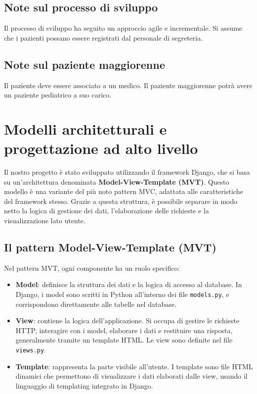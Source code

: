 \documentclass[a4paper,12pt]{article}
\begin{document}
\subsection{Note sul processo di sviluppo}
Il processo di sviluppo ha seguito un approccio agile e incrementale. 
Si assume che i pazienti possano essere registrati dal personale di segreteria.

\subsection{Note sul paziente maggiorenne}
Il paziente deve essere associato a un medico.
Il paziente maggiorenne potrà avere un paziente pediatrico a suo carico.

\section{Modelli architetturali e progettazione ad alto livello}

Il nostro progetto è stato sviluppato utilizzando il framework Django, che si basa su un'architettura denominata \textbf{Model-View-Template (MVT)}. 
Questo modello è una variante del più noto pattern MVC, adattata alle caratteristiche del framework stesso. Grazie a questa struttura, 
è possibile separare in modo netto la logica di gestione dei dati, l'elaborazione delle richieste e la visualizzazione lato utente.

\subsection{Il pattern Model-View-Template (MVT)}
Nel pattern MVT, ogni componente ha un ruolo specifico:

\begin{itemize}
    \item \textbf{Model}: definisce la struttura dei dati e la logica di accesso al database. In Django, i model sono scritti in Python all’interno dei file \texttt{models.py}, e corrispondono direttamente alle tabelle nel database.
    
    \item \textbf{View}: contiene la logica dell’applicazione. Si occupa di gestire le richieste HTTP, interagire con i model, elaborare i dati e restituire una risposta, generalmente tramite un template HTML. Le view sono definite nel file \texttt{views.py}.
    
    \item \textbf{Template}: rappresenta la parte visibile all’utente. I template sono file HTML dinamici che permettono di visualizzare i dati elaborati dalle view, usando il linguaggio di templating integrato in Django.
\end{itemize}
\end{document}
